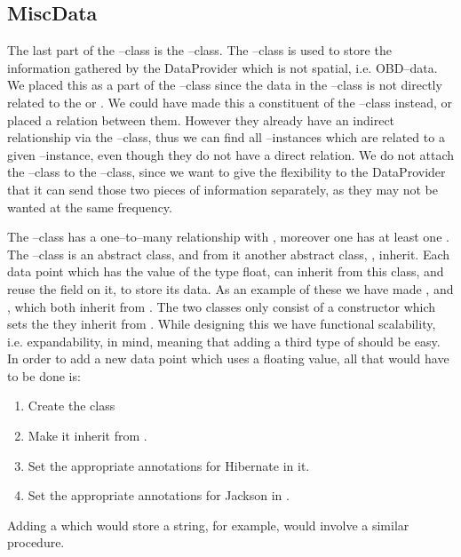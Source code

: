 \subsection{MiscData}
The last part of the --class is the --class. 
The --class is used to store the information gathered by the DataProvider which is not spatial, i.e. \ac{OBD}--data.
We placed this as a part of the --class since the data in the --class is not directly related to the  or . 
We could have made this a constituent of the --class instead, or placed a relation between them.
However they already have an indirect relationship via the --class, 
thus we can find all --instances which are related to a given --instance, even though they do not have a direct relation. 
We do not attach the --class to the --class, 
since we want to give the flexibility to the DataProvider that it can send those two pieces of information separately, as they may not be wanted at the same frequency. 

The --class has a one--to--many relationship with , moreover one  has at least one . 
The --class is an abstract class, and from it another abstract class, , inherit. 
Each data point which has the value of the type float, can inherit from this class, and reuse the  field on it, to store its data.
As an example of these we have made , and , which both inherit from . 
The two classes only consist of a constructor which sets the  they inherit from .
While designing this we have functional scalability, i.e. expandability, in mind, meaning that adding a third type of  should be easy. 
In order to add a new data point which uses a floating value, all that would have to be done is: 
\begin{enumerate}
    \item Create the class 
    \item Make it inherit from .
    \item Set the appropriate annotations for Hibernate in it.
    \item Set the appropriate annotations for Jackson in .
\end{enumerate}

Adding a  which would store a string, for example, would involve a similar procedure.
